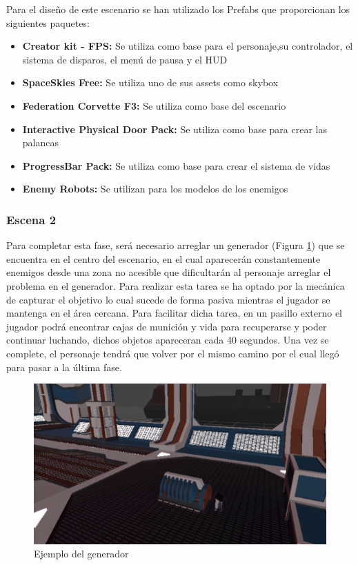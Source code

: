 Para el diseño de este escenario se han utilizado los Prefabs que proporcionan los siguientes paquetes:
\begin{itemize}
	\item \textbf {Creator kit - FPS:} Se utiliza como base para el personaje,su controlador, el sistema de disparos, el menú de pausa y el HUD
	\item \textbf{SpaceSkies Free:} Se utiliza uno de sus assets como skybox
	\item \textbf{Federation Corvette F3:} Se utiliza como base del escenario
	\item \textbf{Interactive Physical Door Pack:} Se utiliza como base para crear las palancas
	\item \textbf{ProgressBar Pack:} Se utiliza como base para crear el sistema de vidas
	\item \textbf{Enemy Robots:} Se utilizan para los modelos de los enemigos
\end{itemize}


\subsubsection{Escena 2}
Para completar esta fase, será necesario arreglar un generador (Figura \ref{fig:Generador}) que se encuentra en el centro del escenario, en el cual aparecerán constantemente enemigos desde una zona no acesible que dificultarán al personaje arreglar el problema en el generador. Para realizar esta tarea se ha optado por la mecánica de capturar el objetivo lo cual sucede de forma pasiva mientras el jugador se mantenga en el área cercana. Para facilitar dicha tarea, en un pasillo externo el jugador podrá encontrar cajas de munición y vida para recuperarse y poder continuar luchando, dichos objetos apareceran cada 40 segundos. Una vez se complete, el personaje tendrá que volver por el mismo camino por el cual llegó para pasar a la última fase.

\begin{figure}[H]
	\centering
	\includegraphics[scale=0.75]{imagenes/Generador.png}
	\caption{\label{fig:Generador}Ejemplo del generador}
\end{figure}

